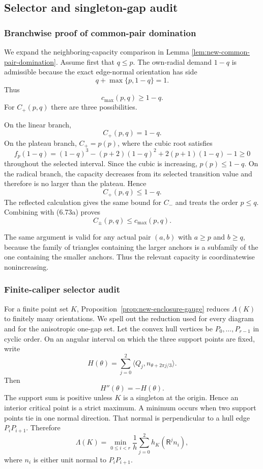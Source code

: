 \subsection{Selector and singleton-gap audit}
\subsubsection{Branchwise proof of common-pair domination}

We expand the neighboring-capacity comparison in Lemma
\ref{lem:new-common-pair-domination}.  Assume first that $q\le p$.
The own-radial demand $1-q$ is admissible because the exact edge-normal
orientation has side
\[
 q+\max\{p,1-q\}=1.
\]
Thus
\[
 c_{\max}(p,q)\ge1-q.
 \tag{6.73a}
\]
For $C_+(p,q)$ there are three possibilities.

On the linear branch,
\[
 C_+(p,q)=1-q.
\]
On the plateau branch, $C_+=p(p)$, where the cubic root satisfies
\[
 f_p(1-q)
 =(1-q)^3-(p+2)(1-q)^2+2(p+1)(1-q)-1\ge0
\]
throughout the selected interval.  Since the cubic is increasing,
$p(p)\le1-q$.  On the radical branch, the capacity decreases from its
selected transition value and therefore is no larger than the plateau.  Hence
\[
 C_+(p,q)\le1-q.
\]
The reflected calculation gives the same bound for $C_-$ and treats the order
$p\le q$.  Combining with (6.73a) proves
\[
 C_\pm(p,q)\le c_{\max}(p,q).
\]

The same argument is valid for any actual pair $(a,b)$ with $a\ge p$ and
$b\ge q$, because the family of triangles containing the larger anchors is a
subfamily of the one containing the smaller anchors.  Thus the relevant
capacity is coordinatewise nonincreasing.

\subsubsection{Finite-caliper selector audit}

For a finite point set $K$, Proposition~\ref{prop:new-enclosure-gauge} reduces
$\Lambda(K)$ to finitely many orientations.  We spell out the reduction used
for every diagram and for the anisotropic one-gap set.  Let the convex hull
vertices be $P_0,\ldots,P_{r-1}$ in cyclic order.  On an angular interval on
which the three support points are fixed, write
\[
 H(\theta)=
 \sum_{j=0}^2
 \langle Q_j,n_{\theta+2\pi j/3}\rangle.
\]
Then
\[
 H''(\theta)=-H(\theta).
\]
The support sum is positive unless $K$ is a singleton at the origin.  Hence an
interior critical point is a strict maximum.  A minimum occurs when two
support points tie in one normal direction.  That normal is perpendicular to
a hull edge $P_iP_{i+1}$.  Therefore
\[
 \Lambda(K)=
 \min_{0\le i<r}
 \frac1h
 \sum_{j=0}^2
 h_K(\mathsf R^jn_i),
 \tag{6.73b}
\]
where $n_i$ is either unit normal to $P_iP_{i+1}$.

